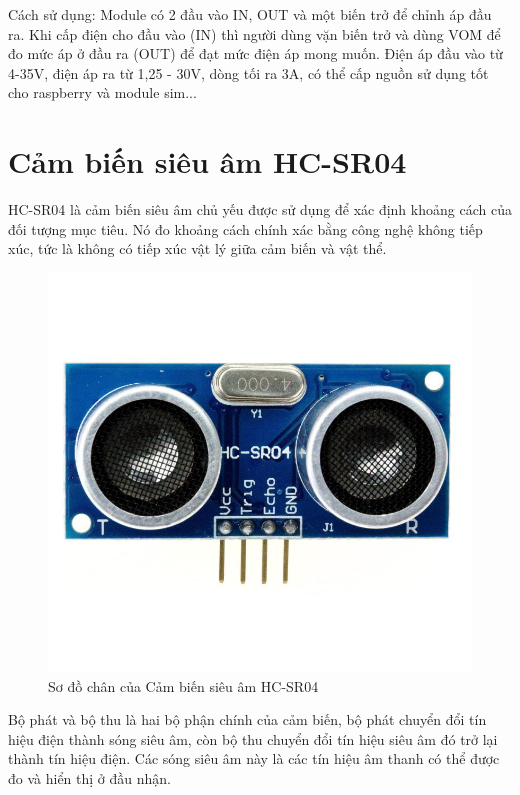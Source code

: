 \documentclass[../DoAn.tex]{subfiles}
\begin{document}
Cách sử dụng: Module có 2 đầu vào IN, OUT và một biến trở để chỉnh áp đầu ra. Khi cấp điện cho đầu vào (IN) thì người dùng vặn biến trở và dùng VOM để đo mức áp ở đầu ra (OUT) để đạt mức điện áp mong muốn. Điện áp đầu vào từ 4-35V, điện áp ra từ 1,25 - 30V, dòng tối ra 3A, có thể cấp nguồn sử dụng tốt cho raspberry và module sim...

\section{Cảm biến siêu âm HC-SR04}
\label{section:3.6}

HC-SR04 là cảm biến siêu âm chủ yếu được sử dụng để xác định khoảng cách của đối tượng mục tiêu. Nó đo khoảng cách chính xác bằng công nghệ không tiếp xúc, tức là không có tiếp xúc vật lý giữa cảm biến và vật thể.

\begin{figure}[H]
    \includegraphics[scale = 0.5]{Hinhve/hcsr04.jpg}
    \centering
    \caption{Sơ đồ chân của Cảm biến siêu âm HC-SR04}
\end{figure}

Bộ phát và bộ thu là hai bộ phận chính của cảm biến, bộ phát chuyển đổi tín hiệu điện thành sóng siêu âm, còn bộ thu chuyển đổi tín hiệu siêu âm đó trở lại thành tín hiệu điện. Các sóng siêu âm này là các tín hiệu âm thanh có thể được đo và hiển thị ở đầu nhận.
\end{document}
